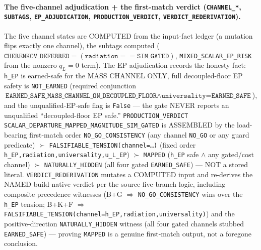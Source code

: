 \paragraph{The five-channel adjudication + the first-match verdict (\texttt{CHANNEL\_*}, \texttt{SUBTAGS}, \texttt{EP\_ADJUDICATION}, \texttt{PRODUCTION\_VERDICT}, \texttt{VERDICT\_REDERIVATION}).}
The five channel states are COMPUTED from the input-fact ledger (a mutation flips
exactly one channel), the subtags computed
(\(\texttt{CHERENKOV\_DEFERRED}{=}(\texttt{radiation}{==}\texttt{SIM\_GATED})\),
\texttt{MIXED\_SCALAR\_EP\_RISK} from the nonzero \(q_L{=}0\) term). The EP
adjudication records the honesty fact: \texttt{h\_EP} is earned-safe for the MASS
CHANNEL ONLY, full decoupled-floor EP safety is \texttt{NOT\_EARNED} (required
conjunction
\(\texttt{EARNED\_SAFE\_MASS\_CHANNEL\_ON\_DECOUPLED\_FLOOR}\wedge\texttt{universality=EARNED\_SAFE}\)),
and the unqualified-EP-safe flag is \texttt{False} --- the gate NEVER reports an
unqualified ``decoupled-floor EP safe.'' \texttt{PRODUCTION\_VERDICT}
\texttt{SCALAR\_DEPARTURE\_MAPPED\_MAGNITUDE\_SIM\_GATED} is ASSEMBLED by the
load-bearing first-match order \texttt{NO\_GO\_CONSISTENCY} (any channel
\texttt{NO\_GO} or any guard predicate) \(\succ\)
\texttt{FALSIFIABLE\_TENSION(channel=\ldots)} (fixed order
\texttt{h\_EP,radiation,universality,u\_L\_EP}) \(\succ\) \texttt{MAPPED}
(\texttt{h\_EP} safe \(\wedge\) any gated/cost channel) \(\succ\)
\texttt{NATURALLY\_HIDDEN} (all four gated \texttt{EARNED\_SAFE}) --- NOT a stored
literal. \texttt{VERDICT\_REDERIVATION} mutates a COMPUTED input and re-derives the
NAMED build-native verdict per the source five-branch logic, including composite
precedence witnesses (B+G \(\Rightarrow\) \texttt{NO\_GO\_CONSISTENCY} wins over
the \texttt{h\_EP} tension; B+K+F \(\Rightarrow\)
\texttt{FALSIFIABLE\_TENSION(channel=h\_EP,radiation,universality)}) and the
positive-direction \texttt{NATURALLY\_HIDDEN} witness (all four gated channels
stubbed \texttt{EARNED\_SAFE}) --- proving \texttt{MAPPED} is a genuine first-match
output, not a foregone conclusion.

